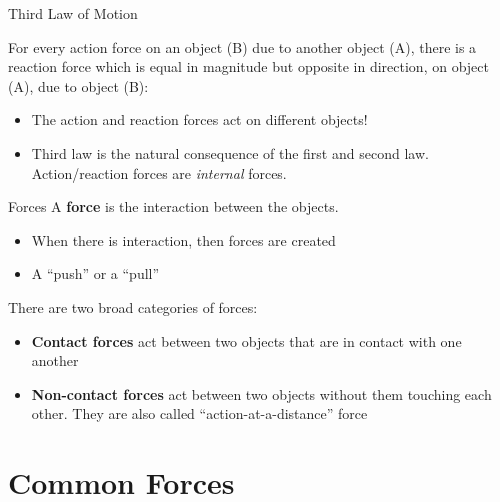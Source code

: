 \documentclass[12pt,compress,aspectratio=169]{beamer}
\begin{document}
\begin{frame}{Third Law of Motion}
  \begin{center}
  \end{center}
  For every action force on an object (B) due to another object (A), there is a
  reaction force which is equal in magnitude but opposite in direction, on
  object (A), due to object (B):

  \begin{itemize}
  \item The action and reaction forces act on different objects!
  \item Third law is the natural consequence of the first and second law.
    Action/reaction forces are \emph{internal} forces.
  \end{itemize}
  \vspace{.2in}
\end{frame}



\begin{frame}{Forces}
  A \textbf{force} is the interaction between the objects.
  \begin{itemize}
  \item When there is interaction, then forces are created
  \item A ``push'' or a ``pull''
  \end{itemize}
  There are two broad categories of forces:
  \begin{itemize}
  \item\textbf{Contact forces} act between two objects that are in contact
    with one another
  \item\textbf{Non-contact forces} act between two objects without them
    touching each other. They are also called ``action-at-a-distance'' force
  \end{itemize}
\end{frame}



\section{Common Forces}
\end{document}
